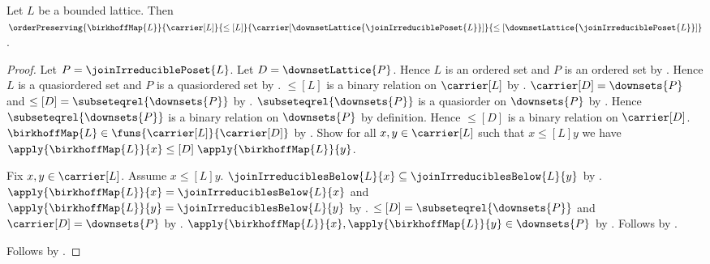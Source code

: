 \begin{theorem}\label{birkhoff_map_order_preserving}
    Let $L$ be a bounded lattice.
    Then
        $\orderPreserving
            {\birkhoffMap{L}}
            {\carrier[L]}{\leq[L]}
            {\carrier[\downsetLattice{\joinIrreduciblePoset{L}}]}
            {\leq[\downsetLattice{\joinIrreduciblePoset{L}}]}$.
\end{theorem}
\begin{proof}
    Let $P=\joinIrreduciblePoset{L}$.
    Let $D=\downsetLattice{P}$.
    Hence $L$ is an ordered set and $P$ is an ordered set by
        .
    Hence $L$ is a quasiordered set and $P$ is a quasiordered set by
        .
    $\leq[L]$ is a binary relation on $\carrier[L]$ by
        .
    $\carrier[D]=\downsets{P}$ and
        $\leq[D]=\subseteqrel{\downsets{P}}$ by
        .
    $\subseteqrel{\downsets{P}}$ is a quasiorder on $\downsets{P}$ by
        .
    Hence $\subseteqrel{\downsets{P}}$ is a binary relation on
        $\downsets{P}$ by definition.
    Hence $\leq[D]$ is a binary relation on $\carrier[D]$.
    $\birkhoffMap{L}\in\funs{\carrier[L]}{\carrier[D]}$ by
        .
    Show for all $x,y\in\carrier[L]$ such that
        $x\mathrel{\leq[L]}y$ we have
        $\apply{\birkhoffMap{L}}{x}\mathrel{\leq[D]}\apply{\birkhoffMap{L}}{y}$.
    \begin{subproof}
        Fix $x,y\in\carrier[L]$.
        Assume $x\mathrel{\leq[L]}y$.
        $\joinIrreduciblesBelow{L}{x}
            \subseteq\joinIrreduciblesBelow{L}{y}$ by
            .
        $\apply{\birkhoffMap{L}}{x}=\joinIrreduciblesBelow{L}{x}$ and
            $\apply{\birkhoffMap{L}}{y}=\joinIrreduciblesBelow{L}{y}$ by
            .
        $\leq[D]=\subseteqrel{\downsets{P}}$ and
            $\carrier[D]=\downsets{P}$ by
            .
        $\apply{\birkhoffMap{L}}{x},\apply{\birkhoffMap{L}}{y}\in\downsets{P}$ by
            .
        Follows by .
    \end{subproof}
    Follows by .
\end{proof}

